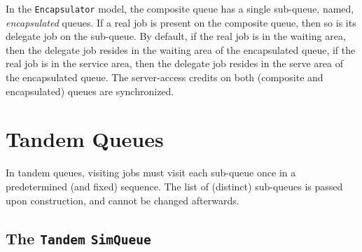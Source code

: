 In the \lstinline|Encapsulator| model,
  the composite queue has a single sub-queue,
  named, {\em encapsulated\/} queues.
If a real job is present on the composite queue,
  then so is its delegate job on the sub-queue.
By default,
  if the real job is in the waiting area,
  then the delegate job resides
  in the waiting area of the encapsulated queue,
  if the real job is in the service area,
  then the delegate job resides in the serve area
  of the encapsulated queue.
The server-access credits on both
  (composite and encapsulated) queues
  are synchronized.
  
\section{Tandem Queues}
\label{sec:tandem-queues}

In tandem queues, visiting jobs must visit each sub-queue once
  in a predetermined (and fixed) sequence.
The list of (distinct) sub-queues is passed upon construction,
  and cannot be changed afterwards.

\subsection{The \lstinline{Tandem} \lstinline{SimQueue}}
\label{sec:Tandem}


